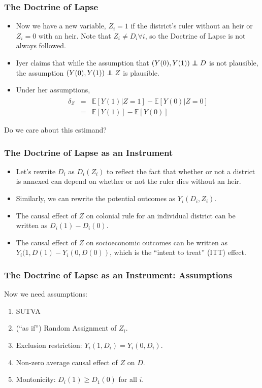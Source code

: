 \documentclass{beamer}
\newcommand\independent{\protect\mathpalette{\protect\independenT}{\perp}}
\def\independenT#1#2{\mathrel{\rlap{$#1#2$}\mkern2mu{#1#2}}}
\begin{document}
   \begin{frame}
     \frametitle{The Doctrine of Lapse}
     \begin{itemize}
     \item Now we have a new variable,   $Z_i=1$ if the district's
       ruler without an heir or  $Z_i=0$ with an heir. Note that $Z_i \neq D_i
       \forall i$, so the Doctrine of Lapse is not always followed. 
     \item Iyer claims that while the assumption that
       $(Y(0),Y(1))\independent D$ is not plausible, the assumption
       $(Y(0),Y(1))\independent Z$ is plausible.
     \item Under her assumptions,
\begin{eqnarray*}
\hat \delta_Z & =&\mathbb{E}[Y(1)|Z=1] - \mathbb{E}[Y(0)|Z=0]  \\
&=&\mathbb{E}[Y(1)] - \mathbb{E}[Y(0)] 
\end{eqnarray*}
     \end{itemize}
Do we care about this estimand? 
\end{frame}

\begin{frame}
  \frametitle{The Doctrine of Lapse as an Instrument}
  \begin{itemize}
  \item Let's rewrite $D_i$ as $D_i(Z_i)$ to reflect the fact that
    whether or not a district is annexed can depend on whether or not
    the ruler dies without an heir.
  \item Similarly, we can rewrite the potential outcomes as
    $Y_i(D_i,Z_i)$.
  \item The causal effect of $Z$ on colonial rule for an individual
    district can be written as $D_i(1)-D_i(0)$. 
\item The causal effect of
    $Z$ on socioeconomic outcomes can be written as
    $Y_i(1,D(1)-Y_i(0,D(0))$, which is the ``intent to treat'' (ITT)
    effect. 
  \end{itemize}
\end{frame}

\begin{frame}
  \frametitle{The Doctrine of Lapse as an Instrument: Assumptions}
Now we need assumptions:
  \begin{enumerate}
  \item SUTVA
  \item (``as if'') Random Assignment of $Z_i$.
  \item Exclusion restriction: $Y_i(1, D_i)=Y_i(0,D_i)$.
  \item Non-zero average causal effect of $Z$ on $D$.
  \item Montonicity: $D_i(1) \geq D_1(0)$ for all $i$.
  \end{enumerate}
\end{frame}
\end{document}
